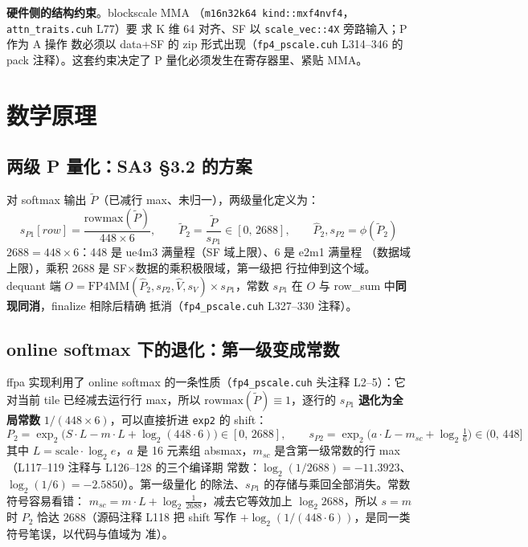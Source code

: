 \textbf{硬件侧的结构约束}。blockscale MMA
（\texttt{m16n32k64 kind::mxf4nvf4}，\texttt{attn\_traits.cuh} L77）要
求 K 维 64 对齐、SF 以 \texttt{scale\_vec::4X} 旁路输入；P 作为 A 操作
数必须以 data+SF 的 zip 形式出现（\texttt{fp4\_pscale.cuh} L314--346 的
pack 注释）。这套约束决定了 P 量化必须发生在寄存器里、紧贴 MMA。

\section{数学原理}

\subsection{两级 P 量化：SA3 §3.2 的方案}

对 softmax 输出 $\tilde P$（已减行 max、未归一），两级量化定义为：
\begin{equation}
  s_{P1}[row]=\frac{\mathrm{rowmax}(\tilde P)}{448\times6},\qquad
  \tilde P_2=\frac{\tilde P}{s_{P1}}\in[0,\,2688],\qquad
  \hat P_2,s_{P2}=\phi(\tilde P_2)
  \label{eq:32-two-level}
\end{equation}
$2688=448\times6$：448 是 ue4m3 满量程（SF 域上限）、6 是 e2m1 满量程
（数据域上限），乘积 2688 是 SF$\times$数据的乘积极限域，第一级把
行拉伸到这个域。dequant 端
$O=\mathrm{FP4MM}(\hat P_2,s_{P2},\hat V,s_V)\times s_{P1}$，常数
$s_{P1}$ 在 $O$ 与 row\_sum 中\textbf{同现同消}，finalize 相除后精确
抵消（\texttt{fp4\_pscale.cuh} L327--330 注释）。

\subsection{online softmax 下的退化：第一级变成常数}

ffpa 实现利用了 online softmax 的一条性质（\texttt{fp4\_pscale.cuh}
头注释 L2--5）：它对当前 tile 已经减去运行行 max，所以
$\mathrm{rowmax}(\tilde P)\equiv1$，逐行的 $s_{P1}$ \textbf{退化为全
局常数} $1/(448\times6)$，可以直接折进 \texttt{exp2} 的 shift：
\begin{equation}
  P_2=\exp_2\!\bigl(S\cdot L-m\cdot L+\log_2(448\cdot6)\bigr)
  \in[0,\,2688],\qquad
  s_{P2}=\exp_2\!\bigl(a\cdot L-m_{sc}+\log_2\tfrac{1}{6}\bigr)\in(0,\,448]
  \label{eq:32-p2-domain}
\end{equation}
其中 $L=\mathrm{scale}\cdot\log_2 e$，$a$ 是 16 元素组 absmax，$m_{sc}$
是含第一级常数的行 max（L117--119 注释与 L126--128 的三个编译期
常数：$\log_2(1/2688)=-11.3923$、$\log_2(1/6)=-2.5850$）。第一级量化
的除法、$s_{P1}$ 的存储与乘回全部消失。常数符号容易看错：
$m_{sc}=m\cdot L+\log_2\frac{1}{2688}$，减去它等效加上
$\log_2 2688$，所以 $s=m$ 时 $P_2$ 恰达 $2688$（源码注释 L118 把
shift 写作 $+\log_2(1/(448\cdot6))$，是同一类符号笔误，以代码与值域为
准）。

